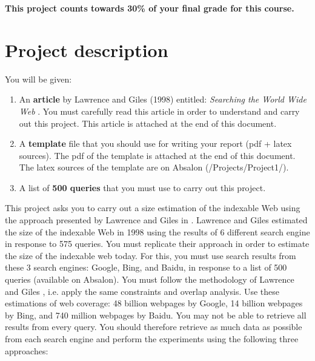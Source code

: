 \documentclass[10pt]{article}
\begin{document}
\maketitle

\textbf{\color{red}This project counts towards 30\% of your final grade for this course.}

\section{Project description}
You will be given:

\begin{enumerate}
\item An \textbf{article} by Lawrence and Giles (1998) entitled: \textit{Searching the World Wide Web} \cite{LawLee1998}. You must carefully read this article in order to understand and carry out this project. This article is attached at the end of this document.
\item A \textbf{template} file that you should use for writing your report (pdf + latex sources). The pdf of the template is attached at the end of this document. The latex sources of the template are on Absalon (/Projects/Project1/).
\item A list of \textbf{500 queries} that you must use to carry out this project.
\end{enumerate}

This project asks you to carry out a size estimation of the indexable Web using the approach presented by Lawrence and Giles in \cite{LawLee1998}. Lawrence and Giles \cite{LawLee1998} estimated the size of the indexable Web in 1998 using the results of 6 different search engine in response to 575 queries. You must replicate their approach in order to estimate the size of the indexable web today. For this, you must use search results from these 3 search engines: Google, Bing, and Baidu, in response to a list of 500 queries (available on Absalon). You must follow the methodology of Lawrence and Giles \cite{LawLee1998}, i.e. apply the same constraints and overlap analysis. Use these estimations of web coverage: 48 billion webpages by Google, 14 billion webpages by Bing, and 740 million webpages by Baidu. You may not be able to retrieve all results from every query. You should therefore retrieve as much data as possible from each search engine and perform the experiments using the following three approaches:
\end{document}
